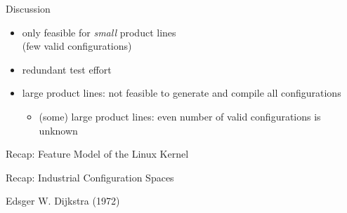 \begin{frame}{\myframetitle{}}
\begin{mycolumns}
\begin{note}{Discussion}
\begin{itemize}
				\setlength\itemsep{.5em}
				\item only feasible for \emph{small} product lines\\(few valid configurations)
				\item redundant test effort
				\vspace*{1ex}
				\item large product lines: not feasible to generate and compile all configurations
				\begin{itemize}
					\item (some) large product lines: even number of valid configurations is unknown
				\end{itemize}
			\end{itemize}
		\end{note}
	\end{mycolumns}
\end{frame}

\begin{frame}{Recap: Feature Model of the Linux Kernel}
	\vspace{1mm}~\hspace{-15mm}\href{https://dl.acm.org/doi/abs/10.1145/3382025.3414943}{}
\end{frame}

\begin{frame}{\myframetitle{}}
	\begin{mycolumns}[widths={60}]
		\begin{exampletight}{Recap: Industrial Configuration Spaces\mysource{\lectureintroduction}}
			\centering{}
		\end{exampletight}
	\mynextcolumn
		\vspace{-7mm}
		\href{https://commons.wikimedia.org/wiki/File:Edsger_Wybe_Dijkstra.jpg}{}
		\vspace{-7mm}
		
		\begin{note}{Edsger W. Dijkstra (1972)}
			\mysource{\thehumbleprogrammer}
		\end{note}
	\end{mycolumns}
\end{frame}

